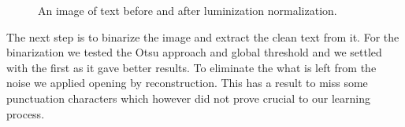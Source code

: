 \begin{figure}
	\centering
	\hfil
	\caption{An image of text \protect{} before and \protect{} after luminization normalization.}
	\label{fig:methods:preprocessing:lumNormalization}
\end{figure}

The next step is to binarize the image and extract the clean text from it. For the binarization we tested the Otsu approach and global threshold and we settled with the first as it gave better results. To eliminate the what is left from the noise we applied opening by reconstruction. This has a result to miss some punctuation characters which however did not prove crucial to our learning process. %